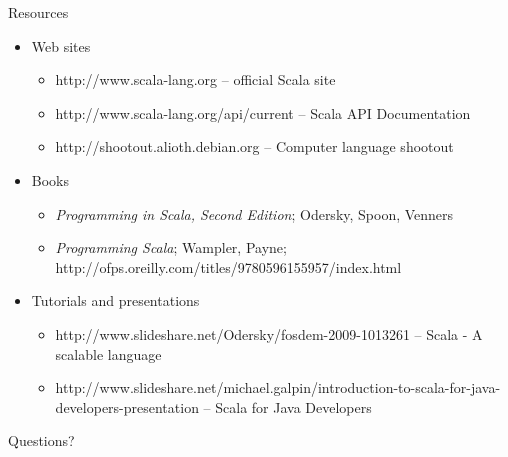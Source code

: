 \documentclass[t]{beamer}
\begin{document}
\begin{frame}{Resources}
  \begin{itemize}
  \item[] Web sites
    \begin{itemize}
    \item[] http://www.scala-lang.org  -- official Scala site
    \item[] http://www.scala-lang.org/api/current -- Scala API Documentation
    \item[] http://shootout.alioth.debian.org -- Computer language shootout 
    \end{itemize}
  \item[] Books
    \begin{itemize}
    \item[] {\it Programming in Scala, Second Edition}; Odersky,
      Spoon, Venners
    \item[] {\it Programming Scala}; Wampler, Payne; http://ofps.oreilly.com/titles/9780596155957/index.html
    \end{itemize}
  \item[] Tutorials and presentations
    \begin{itemize}
    \item[] http://www.slideshare.net/Odersky/fosdem-2009-1013261 --
      Scala - A scalable language
    \item[]http://www.slideshare.net/michael.galpin/introduction-to-scala-for-java-developers-presentation
      -- Scala for Java Developers
    \end{itemize}
  \end{itemize}
  \note{}
\end{frame}

\begin{frame}{Questions?}
  \note{}
\end{frame}
\end{document}
